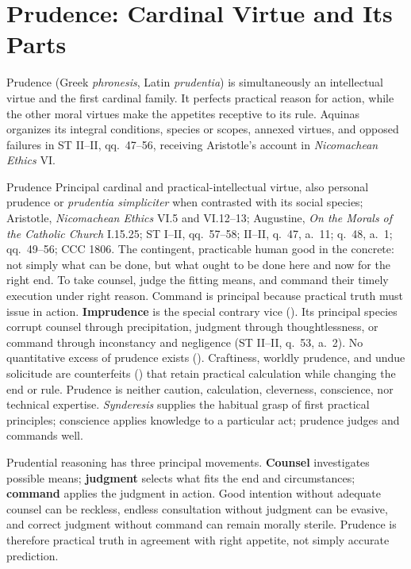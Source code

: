 \section{Prudence: Cardinal Virtue and Its Parts}
\label{sec:prudence}

Prudence (Greek \emph{phronesis}, Latin \emph{prudentia}) is simultaneously an intellectual virtue and the first cardinal family. It perfects practical reason for action, while the other moral virtues make the appetites receptive to its rule. Aquinas organizes its integral conditions, species or scopes, annexed virtues, and opposed failures in ST II--II, qq.~47--56, receiving Aristotle's account in \emph{Nicomachean Ethics} VI.


\virtuedossier
  {Prudence}
  {Principal cardinal and practical-intellectual virtue, also personal prudence or \emph{prudentia simpliciter} when contrasted with its social species; Aristotle, \emph{Nicomachean Ethics} VI.5 and VI.12--13; Augustine, \emph{On the Morals of the Catholic Church} I.15.25; ST I--II, qq.~57--58; II--II, q.~47, a.~11; q.~48, a.~1; qq.~49--56; CCC 1806.}
  {The contingent, practicable human good in the concrete: not simply what can be done, but what ought to be done here and now for the right end.}
  {To take counsel, judge the fitting means, and command their timely execution under right reason. Command is principal because practical truth must issue in action.}
  {\textbf{Imprudence} is the special contrary vice (). Its principal species corrupt counsel through precipitation, judgment through thoughtlessness, or command through inconstancy and negligence (ST II--II, q.~53, a.~2).}
  {No quantitative excess of prudence exists (). Craftiness, worldly prudence, and undue solicitude are counterfeits () that retain practical calculation while changing the end or rule.}
  {Prudence is neither caution, calculation, cleverness, conscience, nor technical expertise. \emph{Synderesis} supplies the habitual grasp of first practical principles; conscience applies knowledge to a particular act; prudence judges and commands well.}

Prudential reasoning has three principal movements. \textbf{Counsel} investigates possible means; \textbf{judgment} selects what fits the end and circumstances; \textbf{command} applies the judgment in action. Good intention without adequate counsel can be reckless, endless consultation without judgment can be evasive, and correct judgment without command can remain morally sterile. Prudence is therefore practical truth in agreement with right appetite, not simply accurate prediction.

